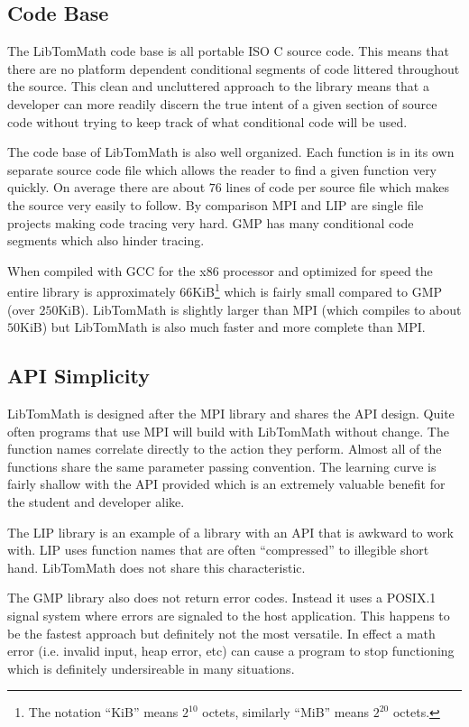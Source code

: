 \documentclass[b5paper]{book}
\begin{document}
\subsection{Code Base}
The LibTomMath code base is all portable ISO C source code.  This means that there are no platform dependent conditional
segments of code littered throughout the source.  This clean and uncluttered approach to the library means that a
developer can more readily discern the true intent of a given section of source code without trying to keep track of
what conditional code will be used.

The code base of LibTomMath is also well organized.  Each function is in its own separate source code file 
which allows the reader to find a given function very quickly.  On average there are about $76$ lines of code per source
file which makes the source very easily to follow.  By comparison MPI and LIP are single file projects making code tracing
very hard.  GMP has many conditional code segments which also hinder tracing.  

When compiled with GCC for the x86 processor and optimized for speed the entire library is approximately $66$KiB\footnote{The notation ``KiB'' means $2^{10}$ octets, similarly ``MiB'' means $2^{20}$ octets.}
 which is fairly small compared to GMP (over $250$KiB).  LibTomMath is slightly larger than MPI (which compiles to about 
$50$KiB) but LibTomMath is also much faster and more complete than MPI.

\subsection{API Simplicity}
LibTomMath is designed after the MPI library and shares the API design.  Quite often programs that use MPI will build 
with LibTomMath without change. The function names correlate directly to the action they perform.  Almost all of the 
functions share the same parameter passing convention.  The learning curve is fairly shallow with the API provided 
which is an extremely valuable benefit for the student and developer alike.  

The LIP library is an example of a library with an API that is awkward to work with.  LIP uses function names that are often ``compressed'' to 
illegible short hand.  LibTomMath does not share this characteristic.  

The GMP library also does not return error codes.  Instead it uses a POSIX.1 \cite{POSIX1} signal system where errors
are signaled to the host application.  This happens to be the fastest approach but definitely not the most versatile.  In
effect a math error (i.e. invalid input, heap error, etc) can cause a program to stop functioning which is definitely 
undersireable in many situations.
\end{document}

